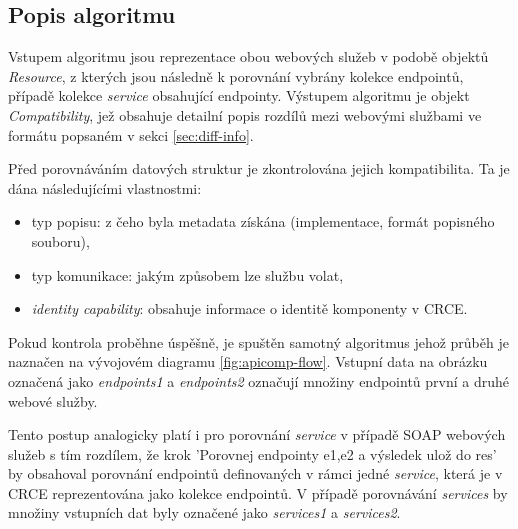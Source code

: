 \documentclass[czech,DP]{thesiskiv}
\begin{document}
\subsection{Popis algoritmu}

Vstupem algoritmu jsou reprezentace obou webových služeb v podobě objektů \textit{Resource}, z kterých jsou následně k porovnání vybrány kolekce endpointů, případě kolekce \textit{service} obsahující endpointy. Výstupem algoritmu je objekt \textit{Compatibility}, jež obsahuje detailní popis rozdílů mezi webovými službami ve formátu popsaném v sekci \ref{sec:diff-info}.

Před porovnáváním datových struktur je zkontrolována jejich kompatibilita. Ta je dána následujícími vlastnostmi:

\begin{itemize}
	\item typ popisu: z čeho byla metadata získána (implementace, formát popisného souboru),
	\item typ komunikace: jakým způsobem lze službu volat,
	\item \textit{identity capability}: obsahuje informace o identitě komponenty v CRCE.
\end{itemize}

Pokud kontrola proběhne úspěšně, je spuštěn samotný algoritmus jehož průběh je naznačen na vývojovém diagramu \ref{fig:apicomp-flow}. Vstupní data na obrázku označená jako \textit{endpoints1} a \textit{endpoints2} označují množiny endpointů první a druhé webové služby. 

Tento postup analogicky platí i pro porovnání \textit{service} v případě SOAP webových služeb s tím rozdílem, že krok 'Porovnej endpointy e1,e2 a výsledek ulož do res' by obsahoval porovnání endpointů definovaných v rámci jedné \textit{service}, která je v CRCE reprezentována jako kolekce endpointů. V případě porovnávání \textit{services} by množiny vstupních dat byly označené jako \textit{services1} a \textit{services2}.
\end{document}
